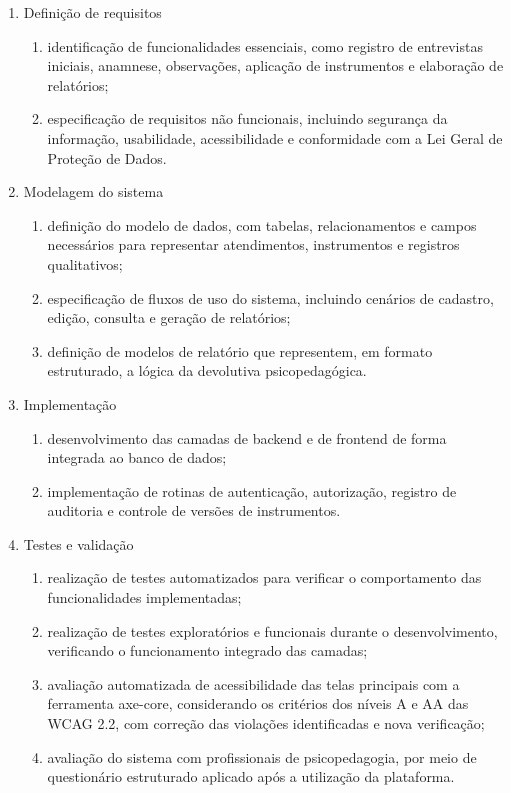 \begin{enumerate}
    \item Definição de requisitos
    \begin{enumerate}
        \item identificação de funcionalidades essenciais, como registro de entrevistas iniciais, anamnese, observações, aplicação de instrumentos e elaboração de relatórios;
        \item especificação de requisitos não funcionais, incluindo segurança da informação, usabilidade, acessibilidade e conformidade com a Lei Geral de Proteção de Dados.
    \end{enumerate}
    \item Modelagem do sistema
    \begin{enumerate}
        \item definição do modelo de dados, com tabelas, relacionamentos e campos necessários para representar atendimentos, instrumentos e registros qualitativos;
        \item especificação de fluxos de uso do sistema, incluindo cenários de cadastro, edição, consulta e geração de relatórios;
        \item definição de modelos de relatório que representem, em formato estruturado, a lógica da devolutiva psicopedagógica.
    \end{enumerate}
    \item Implementação
    \begin{enumerate}
        \item desenvolvimento das camadas de backend e de frontend de forma integrada ao banco de dados;
        \item implementação de rotinas de autenticação, autorização, registro de auditoria e controle de versões de instrumentos.
    \end{enumerate}
    \item Testes e validação
    \begin{enumerate}
        \item realização de testes automatizados para verificar o comportamento das funcionalidades implementadas;
        \item realização de testes exploratórios e funcionais durante o desenvolvimento, verificando o funcionamento integrado das camadas;
        \item avaliação automatizada de acessibilidade das telas principais com a ferramenta axe-core, considerando os critérios dos níveis A e AA das WCAG 2.2, com correção das violações identificadas e nova verificação;
        \item avaliação do sistema com profissionais de psicopedagogia, por meio de questionário estruturado aplicado após a utilização da plataforma.
    \end{enumerate}
\end{enumerate}

